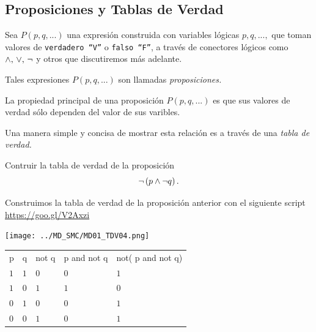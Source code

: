 \documentclass[xcolor={svgnames},
  hyperref={colorlinks}, 
  spanish, 12pt]{beamer}
\numberwithin{equation}{section} %
\numberwithin{figure}{section} %
\begin{document}
\subsection{Proposiciones y Tablas de Verdad}

\begin{frame}
 Sea $P(p,q,...)$ una expresi\'on construida con variables l\'ogicas $p,q,...,$ que toman valores de \texttt{verdadero ``V''} o \texttt{falso ``F''}, a trav\'es de conectores l\'ogicos como $\wedge, \, \vee, \, \neg$ y otros  que discutiremos m\'as adelante.
 \pause
 
 Tales expresiones $P(p,q,...)$ son llamadas \emph{proposiciones.}
\end{frame}

\begin{frame}
 La propiedad principal de una proposici\'on $P(p,q,...)$ es que sus valores de verdad s\'olo dependen del valor de sus varibles. 
 \pause
 
 Una manera simple y concisa de mostrar esta relaci\'on es a trav\'es de una \emph{tabla de verdad.}
\end{frame}

\begin{frame}
 \begin{exmp}
  Contruir la tabla de verdad de la proposici\'on
  $$\neg \left( p \wedge \neg q \right).$$
 \end{exmp}

\end{frame}

\begin{frame}
 Construimos la tabla de verdad de la proposici\'on anterior con el siguiente script \href{https://goo.gl/V2Axzi}{https://goo.gl/V2Axzi}
\begin{center}
        \texttt{[image: ../MD\_SMC/MD01\_TDV04.png]}
\end{center}
 
\end{frame}

\begin{frame}
 \begin{tdv} 
  \begin{tabular}{lllll}
p & q & not q & p and not q & not( p and not q) \\
$1$ & $1$ & $0$ & $0$ & $1$ \\
$1$ & $0$ & $1$ & $1$ & $0$ \\
$0$ & $1$ & $0$ & $0$ & $1$ \\
$0$ & $0$ & $1$ & $0$ & $1$ \\
\end{tabular}
 \end{tdv}

\end{frame}
\end{document}
